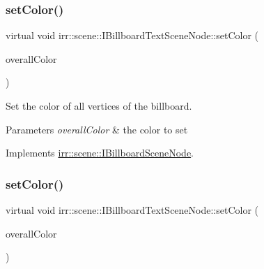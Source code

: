 \subsubsection{\texorpdfstring{set\+Color()}{setColor()}\hspace{0.1cm}{\footnotesize\ttfamily [1/4]}}
{\footnotesize\ttfamily virtual void irr\+::scene\+::\+I\+Billboard\+Text\+Scene\+Node\+::set\+Color (\begin{DoxyParamCaption}\item[{const \hyperlink{classirr_1_1video_1_1SColor}{video\+::\+S\+Color} \&}]{overall\+Color }\end{DoxyParamCaption})\hspace{0.3cm}{\ttfamily [pure virtual]}}



Set the color of all vertices of the billboard. 


\begin{DoxyParams}{Parameters}
{\em overall\+Color} & the color to set \\
\hline
\end{DoxyParams}


Implements \hyperlink{classirr_1_1scene_1_1IBillboardSceneNode_a82c1038a6dfcd255863baa96aaba4182}{irr\+::scene\+::\+I\+Billboard\+Scene\+Node}.

\mbox{\label{classirr_1_1scene_1_1IBillboardTextSceneNode_aaa65d10d3a49206728c47b148a64bb4a}} 
\subsubsection{\texorpdfstring{set\+Color()}{setColor()}\hspace{0.1cm}{\footnotesize\ttfamily [2/4]}}
{\footnotesize\ttfamily virtual void irr\+::scene\+::\+I\+Billboard\+Text\+Scene\+Node\+::set\+Color (\begin{DoxyParamCaption}\item[{const \hyperlink{classirr_1_1video_1_1SColor}{video\+::\+S\+Color} \&}]{overall\+Color }\end{DoxyParamCaption})\hspace{0.3cm}{\ttfamily [pure virtual]}}



